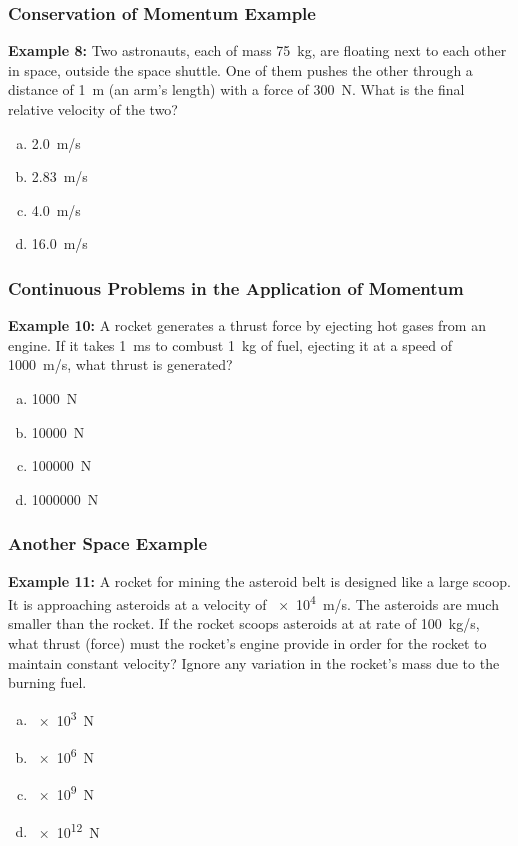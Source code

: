 \documentclass[12pt,compress,aspectratio=169]{beamer}
\begin{document}
\begin{frame}
  \frametitle{Conservation of Momentum Example}
  \textbf{Example 8:} Two astronauts, each of mass \SI{75}{kg}, are floating
  next to each other in space, outside the space shuttle. One of them pushes
  the other through a distance of \SI{1}{m} (an arm's length) with a force of
  \SI{300}{\newton}. What is the final relative velocity of the two?
  \begin{enumerate}[(a)]
  \item \SI{2.0}{m/s}
  \item \SI{2.83}{m/s}
  \item \SI{4.0}{m/s}
  \item \SI{16.0}{m/s}
  \end{enumerate}
\end{frame}

\begin{frame}
  \frametitle{Continuous Problems in the Application of Momentum}

%
  \textbf{Example 10:} A rocket generates a thrust force by ejecting hot gases
  from an engine. If it takes \SI{1}{\milli\second} to combust \SI{1}{kg} of
  fuel, ejecting it at a speed of \SI{1000}{m/s}, what thrust is generated?
  \begin{enumerate}[(a)]
  \item \SI{1000}{\newton}
  \item \SI{10000}{\newton}
  \item \SI{100000}{\newton}
  \item \SI{1000000}{\newton}
  \end{enumerate}
\end{frame}

\begin{frame}
  \frametitle{Another Space Example}
  \textbf{Example 11:} A rocket for mining the asteroid belt is designed like a
  large scoop. It is approaching asteroids at a velocity of \SI{e4}{m/s}. The
  asteroids are much smaller than the rocket. If the rocket scoops asteroids at
  at rate of \SI{100}{kg/s}, what thrust (force) must the rocket's engine
  provide in order for the rocket to maintain constant velocity? Ignore any
  variation in the rocket's mass due to the burning fuel.
  \begin{enumerate}[(a)]
  \item \SI{e3}{\newton}
  \item \SI{e6}{\newton}
  \item \SI{e9}{\newton}
  \item \SI{e12}{\newton}
  \end{enumerate}
\end{frame}
\end{document}
